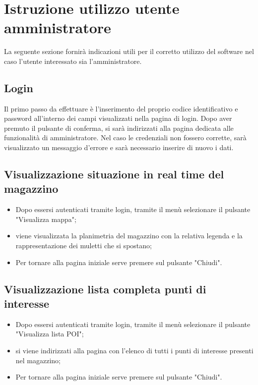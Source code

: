 \section{Istruzione utilizzo utente amministratore}

La seguente sezione fornirà indicazioni utili per il corretto utilizzo del software nel caso l'utente interessato sia l'amministratore.

\subsection{Login}
Il primo passo da effettuare è l'inserimento del proprio codice identificativo e password all'interno dei campi visualizzati nella pagina di login. Dopo aver premuto il pulsante di conferma, si sarà indirizzati alla pagina dedicata alle funzionalità di amministratore. Nel caso le credenziali non fossero corrette, sarà visualizzato un messaggio d'errore e sarà necessario inserire di nuovo i dati.

\subsection{Visualizzazione situazione in real time del magazzino}
\begin{itemize}
    \item Dopo essersi autenticati tramite login, tramite il menù selezionare il pulsante "Visualizza mappa";
    \item viene visualizzata la planimetria del magazzino con la relativa legenda e la rappresentazione dei muletti che si spostano;
    \item Per tornare alla pagina iniziale serve premere sul pulsante "Chiudi".
\end{itemize}
\subsection{Visualizzazione lista completa punti di interesse}
\begin{itemize}
    \item Dopo essersi autenticati tramite login, tramite il menù selezionare il pulsante "Visualizza lista POI";
    \item si viene indirizzati alla pagina con l'elenco di tutti i punti di interesse presenti nel magazzino;
    \item Per tornare alla pagina iniziale serve premere sul pulsante "Chiudi".
\end{itemize}
